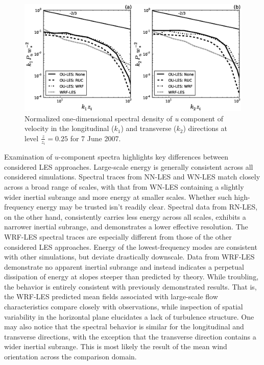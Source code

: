 \begin{figure}[H]
\begin{center}
\includegraphics[width=\textwidth]{figures/chapter6/spectra1D_u_20070607}
\end{center}
\caption{Normalized one-dimensional spectral density of \textit{u} component of velocity in the longitudinal ($k_1$) and transverse ($k_2$) directions at level $\frac{z}{z_i}=0.25$ for 7 June 2007.}
\label{figure606}
\end{figure}


Examination of $u$-component spectra highlights key differences between considered LES approaches. Large-scale energy is generally consistent across all considered simulations. Spectral traces from NN-LES and WN-LES match closely across a broad range of scales, with that from WN-LES containing a slightly wider inertial subrange and more energy at smaller scales. Whether such high-frequency energy may be trusted isn't readily clear. Spectral data from RN-LES, on the other hand, consistently carries less energy across all scales, exhibits a narrower inertial subrange, and demonstrates a lower effective resolution. The WRF-LES spectral traces are especially different from those of the other considered LES approaches. Energy of the lowest-frequency modes are consistent with other simulations, but deviate drastically downscale. Data from WRF-LES demonstrate no apparent inertial subrange and instead indicates a perpetual dissipation of energy at slopes steeper than predicted by theory. While troubling, the behavior is entirely consistent with previously demonstrated results. That is, the WRF-LES predicted mean fields associated with large-scale flow characteristics compare closely with observations, while inspection of spatial variability in the horizontal plane elucidates a lack of turbulence structure. One may also notice that the spectral behavior is similar for the longitudinal and transverse directions, with the exception that the transverse direction contains a wider inertial subrange. This is most likely the result of the mean wind orientation across the comparison domain.

